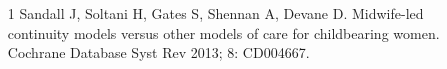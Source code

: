 \documentclass{article}
\begin{document}
\section*{}
\begin{itemize}

\item[1] Sandall J, Soltani H, Gates S, Shennan A, Devane D. Midwife-led
continuity
models versus other models of care for childbearing women. Cochrane Database
Syst Rev
2013; 8: CD004667.

\end{itemize}
\end{document}
